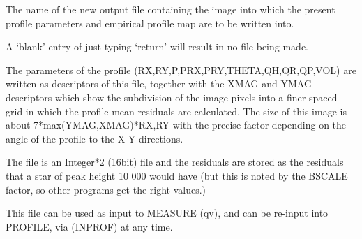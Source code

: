 {{{ The name of the new output file containing the image into which the
 present profile parameters and empirical profile map are to be written
 into.
                                                                               
 A `blank' entry of just typing `return' will result in no file being
 made.
                                                                               
 The parameters of the profile (RX,RY,P,PRX,PRY,THETA,QH,QR,QP,VOL)
 are written as descriptors of this file, together with the
 XMAG and YMAG descriptors which show the subdivision of the image
 pixels into a finer spaced grid in which the profile mean residuals
 are calculated. The size of this image is about 7*max(YMAG,XMAG)*RX,RY
 with the precise factor depending on the angle of the
 profile to the X-Y directions.
                                                                               
 The file is an Integer*2 (16bit) file and the residuals are stored
 as the residuals that a star of peak height 10 000 would have (but
 this is noted by the BSCALE factor, so other programs get the right
 values.)
                                                                               
 This file can be used as input to MEASURE (qv), and can be re-input
 into PROFILE, via (INPROF) at any time.
                                                                               
                                                                               
}}}
